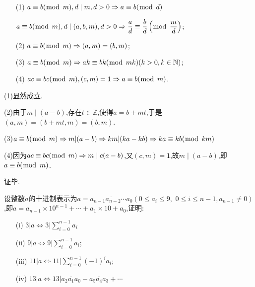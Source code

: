 \theorem [(可约性)]
\begin{enumerate}[itemindent=2em]
	\item[(1)] $a \equiv b(\bmod \hspace{1ex}m), d \mid m, d>0 \Rightarrow a \equiv b(\bmod \hspace{1ex}d)$
	
	$a \equiv b(\bmod \hspace{1ex}m), d \mid(a, b, m), d>0 \Rightarrow \dfrac{a}{d} \equiv \dfrac{b}{d}\left(\bmod \hspace{1ex}\dfrac{m}{d}\right)$;
	\item[(2)] $a \equiv b(\bmod \hspace{1ex}m) \Rightarrow(a, m)=(b, m)$;
	\item[(3)] $a \equiv b(\bmod \hspace{1ex}m) \Rightarrow a k \equiv b k(\bmod \hspace{1ex}m k)(k>0, k \in \mathbb{N})$;
	\item[(4)] $a c \equiv b c(\bmod \hspace{1ex}m),(c, m)=1 \Rightarrow a \equiv b(\bmod \hspace{1ex}m)$.
\end{enumerate}

\proof (1)显然成立.

(2)由于$m \mid(a-b)$,存在$t \in \mathbb{Z}$,使得$a=b+m t$,于是$(a, m)=(b+m t, m)=(b, m)$.

(3)$a \equiv b(\bmod \hspace{1ex}m) \Rightarrow m|(a-b) \Rightarrow k m|(k a-k b) \Rightarrow k a \equiv k b(\bmod \hspace{1ex}k m)$

(4)因为$a c \equiv b c(\bmod \hspace{1ex}m) \Rightarrow m \mid c(a-b)$,又$(c, m)=1$,故$m \mid(a-b)$,即$a \equiv b(\bmod \hspace{1ex}m)$.

证毕.

\example 设整数$a$的十进制表示为$a=\overline{a_{n-1} a_{n-2} \cdots a_{0}}\left(0 \leqslant a_{i} \leqslant 9,\right.$ $\left.0 \leqslant i \leqslant n-1, a_{n-1} \neq 0\right)$,即$a=a_{n-1} \times 10^{n-1}+\cdots+a_{1} \times 10+a_{0}$,证明:
\begin{enumerate}[itemindent=2em]
	\item[(i)] $3|a \Leftrightarrow 3| \displaystyle{\sum_{i=0}^{n-1}} a_{i}$
	\item[(ii)] $9|a \Leftrightarrow 9| \displaystyle{\sum_{i=0}^{n-1}} a_{i}$;
	\item[(iii)] $11|a \Leftrightarrow 11| \displaystyle{\sum_{i=0}^{n-1}}(-1)^{i} a_{i}$;
	\item[(iv)] $13|a \Leftrightarrow 13| \overline{a_{2} a_{1} a_{0}}-\overline{a_{5} a_{4} a_{3}}+\cdots$
\end{enumerate}

